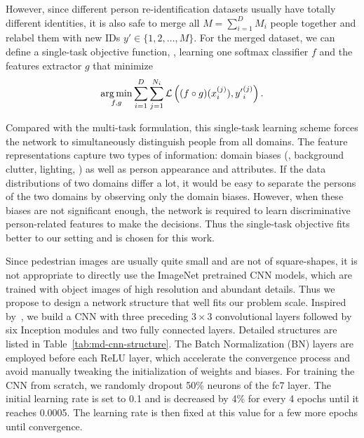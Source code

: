 However, since different person re-identification datasets usually have totally different identities, it is also safe to merge all $M=\sum_{i=1}^D M_i$ people together and relabel them with new IDs ${y'} \in \{1,2,\dots,M\}$. For the merged dataset, we can define a single-task objective function, \ie, learning one softmax classifier $f$ and the features extractor $g$ that minimize
\begin{equation} \label{eq:md-single-task-objfunc}
    \mathop{\mathrm{arg\,min}}_{f,g} \sum_{i=1}^D \sum_{j=1}^{N_i} \mathcal{L}\left( (f\circ g)(x_i^{(j)}), {y'}_i^{(j)} \right).
\end{equation}

Compared with the multi-task formulation, this single-task learning scheme forces the network to simultaneously distinguish people from all domains. The feature representations capture two types of information: domain biases (\eg, background clutter, lighting, \etc) as well as person appearance and attributes. If the data distributions of two domains differ a lot, it would be easy to separate the persons of the two domains by observing only the domain biases. However, when these biases are not significant enough, the network is required to learn discriminative person-related features to make the decisions. Thus the single-task objective fits better to our setting and is chosen for this work.

Since pedestrian images are usually quite small and are not of square-shapes, it is not appropriate to directly use the ImageNet pretrained CNN models, which are trained with object images of high resolution and abundant details. Thus we propose to design a network structure that well fits our problem scale. Inspired by~\cite{ioffe2015batch,simonyan2014very}, we build a CNN with three preceding $3\times 3$ convolutional layers followed by six Inception modules and two fully connected layers. Detailed structures are listed in Table~\ref{tab:md-cnn-structure}. The Batch Normalization (BN) layers are employed before each ReLU layer, which accelerate the convergence process and avoid manually tweaking the initialization of weights and biases. For training the CNN from scratch, we randomly dropout 50\% neurons of the fc7 layer. The initial learning rate is set to 0.1 and is decreased by 4\% for every 4 epochs until it reaches 0.0005. The learning rate is then fixed at this value for a few more epochs until convergence.

